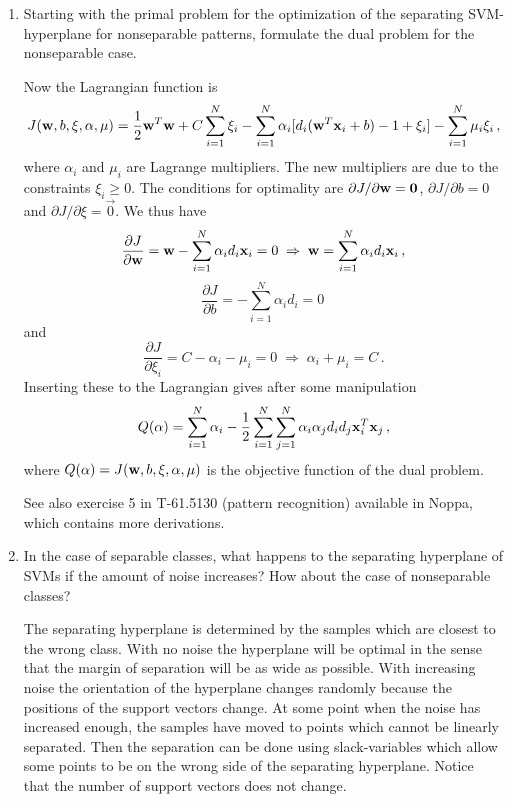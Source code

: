 \begin{enumerate}

\item Starting with the primal problem for the optimization of the
  separating SVM-hyperplane for nonseparable patterns, formulate the
  dual problem for the nonseparable case.

  \begin{solution}

    Now the Lagrangian function is $$J(\mathbf{w}, b, \xi, \alpha, \mu) =
    \frac{1}{2}\mathbf{w}^T\mathbf{w} + C \sum_{i=1}^N \xi_i - \sum_{i=1}^N
    \alpha_i[d_i(\mathbf{w}^T \mathbf{x}_i + b) - 1 + \xi_i] - \sum_{i=1}^N \mu_i \xi_i
    \, ,$$ where $\alpha_i$ and $\mu_i$ are Lagrange multipliers.  The
    new multipliers are due to the constraints $\xi_i \geq 0$.  The
    conditions for optimality are $\partial J/\partial \mathbf{w} = \mathbf{0}$,
    $\partial J/\partial b = 0$ and $\partial J/\partial \xi = \vec{0}$.
    We thus have $$\frac{\partial J}{\partial \mathbf{w}} = \mathbf{w} - \sum_{i=1}^N
    \alpha_i d_i \mathbf{x}_i = 0 \; \Rightarrow \; \mathbf{w} = \sum_{i=1}^N \alpha_i
    d_i \mathbf{x}_i \, ,$$ $$\frac{\partial J}{\partial b} = - \sum_{i=1}^N
    \alpha_i d_i = 0 \,$$ and $$\frac{\partial J}{\partial \xi_i} = C -
    \alpha_i - \mu_i = 0 \; \Rightarrow \; \alpha_i + \mu_i = C \, .$$
    Inserting these to the Lagrangian gives after some manipulation
    $$Q(\alpha) = \sum_{i=1}^N \alpha_i - \frac{1}{2} \sum_{i=1}^N
    \sum_{j=1}^N \alpha_i \alpha_j d_i d_j \mathbf{x}_i^T \mathbf{x}_j \, ,$$ where
    $Q(\alpha) = J(\mathbf{w}, b, \xi, \alpha, \mu)$ is the objective function
    of the dual problem.

    See also exercise 5 in T-61.5130 (pattern recognition) available in Noppa, which contains more derivations.
  \end{solution}
  
\item In the case of separable classes, what happens to the separating
  hyperplane of SVMs if the amount of noise increases? How about the
  case of nonseparable classes?

  \begin{solution}

    The separating hyperplane is determined by the samples which are
    closest to the wrong class.  With no noise the hyperplane will be
    optimal in the sense that the margin of separation will be as wide
    as possible.  With increasing noise the orientation of the
    hyperplane changes randomly because the positions of the support
    vectors change.  At some point when the noise has increased enough,
    the samples have moved to points which cannot be linearly separated.
    Then the separation can be done using slack-variables which allow
    some points to be on the wrong side of the separating hyperplane.
    Notice that the number of support vectors does not change.
  \end{solution}
  

\end{enumerate}
